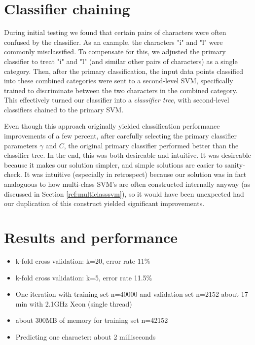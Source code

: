 \documentclass{netsec2012}
\begin{document}
\section{Classifier chaining}

During initial testing we found that certain pairs of characters were often confused by the
classifier.  As an example, the characters "i" and "l" were commonly misclassified.  To compensate
for this, we adjusted the primary classifier to treat "i" and "l" (and similar other pairs of
characters) as a single category.  Then, after the primary classification, the input data points
classified into these combined categories were sent to a second-level SVM, specifically trained to
discriminate between the two characters in the combined category.  This effectively turned our
classifier into a \emph{classifier tree}, with second-level classifiers chained to the primary SVM.

Even though this approach originally yielded classification performance improvements of a few
percent, after carefully selecting the primary classifier parameters $\gamma$ and $C$, the original
primary classifier performed better than the classifier tree.  In the end, this was both desireable
and intuitive.  It was desireable because it makes our solution simpler, and simple solutions are
easier to sanity-check.  It was intuitive (especially in retrospect) because our solution was in
fact analoguous to how multi-class SVM's are often constructed internally anyway (as discussed in
Section \ref{ref:multiclasssvm}), so it would have been unexpected had our duplication of this
construct yielded significant improvements.


\section{Results and performance}

\label{ref:datachallenge}

\begin{itemize}
\item k-fold cross validation: k=20, error rate 11\%
\item k-fold cross validation: k=5, error rate 11.5\%
\item One iteration with training set n=40000 and validation set n=2152 about 17 min with 2.1GHz Xeon (single thread)
\item about 300MB of memory for training set n=42152
\item Predicting one character: about 2 milliseconds

\end{itemize}
\end{document}
